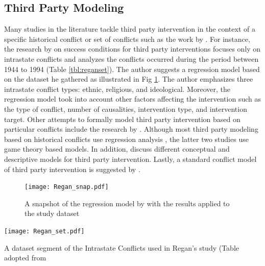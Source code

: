 \documentclass[letterpaper,12pt,titlepage,oneside,final]{book}
\begin{document}
\subsection{Third Party Modeling}
\label{sec:tpmodel}
Many studies in the literature tackle third party intervention in the context of a specific historical conflict or set of conflicts such as the work by \citet{regan1996,bercovitch1991,dixon1996}.  For instance, the research by \citet{regan1996} on success conditions for third party interventions focuses only on intrastate conflicts and analyzes the conflicts occurred during the period between 1944 to 1994 (Table \ref{tbl:reganset}). The author suggests a regression model based on the dataset he gathered as illustrated in Fig \ref{fig:regansnap}.  The author emphasizes three intrastate conflict types: ethnic, religious, and ideological. Moreover, the regression model took into account other factors affecting the intervention such as the type of conflict, number of causalities, intervention type, and intervention target.
Other attempts to formally model third party intervention based on particular conflicts include the research by \citet{carment1996,HipelRami}. Although most third party modeling based on historical conflicts use regression analysis \citep{regan1996,dixon1996}, the latter two studies use game theory based models. In addition, \citet{fisher2001,lewicki1992} discuss different conceptual and descriptive models for third party intervention. Lastly, a standard conflict model of third party intervention is suggested by \citet{siqueira2003}.


\begin{center}
\begin{figure}[H]
\centering
\texttt{[image: Regan\_snap.pdf]}

\caption{A snapshot of the regression model by \citet{regan1996} with the results applied to the study dataset}

\label{fig:regansnap}
\end{figure}
\end{center}

\begin{center}

\begin{table}[H]
\centering
\texttt{[image: Regan\_set.pdf]}

\caption{A dataset segment of the Intrastate Conflicts used in Regan's study (Table adopted from \citet{regan1996}}

\label{tbl:reganset}
\end{table}

\end{center}
\end{document}
